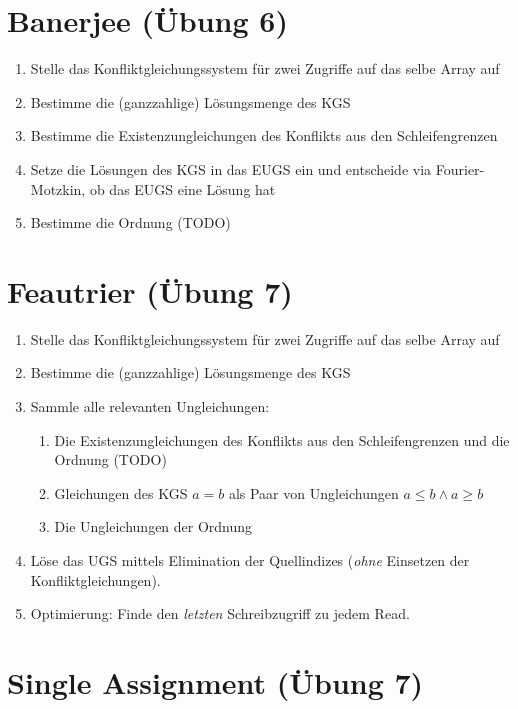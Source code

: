 \documentclass[a4paper,10pt]{article}
\begin{document}
\section{Banerjee (Übung 6)}

\begin{enumerate}
    \item Stelle das Konfliktgleichungssystem für zwei Zugriffe auf das selbe Array auf
    \item Bestimme die (ganzzahlige) Lösungsmenge des KGS
    \item Bestimme die Existenzungleichungen des Konflikts aus den Schleifengrenzen
    \item Setze die Lösungen des KGS in das EUGS ein und entscheide via Fourier-Motzkin, ob das EUGS eine Lösung hat
    \item Bestimme die Ordnung (TODO)
\end{enumerate}

\section{Feautrier (Übung 7)}

\begin{enumerate}
    \item Stelle das Konfliktgleichungssystem für zwei Zugriffe auf das selbe Array auf
    \item Bestimme die (ganzzahlige) Lösungsmenge des KGS
    \item Sammle alle relevanten Ungleichungen:\begin{enumerate}
        \item Die Existenzungleichungen des Konflikts aus den Schleifengrenzen und die Ordnung (TODO)
        \item Gleichungen des KGS $a=b$ als Paar von Ungleichungen $a\leq b\wedge a\geq b$
        \item Die Ungleichungen der Ordnung
    \end{enumerate}
    \item Löse das UGS mittels Elimination der Quellindizes (\textit{ohne} Einsetzen der Konfliktgleichungen).
    \item Optimierung: Finde den \textit{letzten} Schreibzugriff zu jedem Read. 
\end{enumerate}

\section{Single Assignment (Übung 7)}
\end{document}
